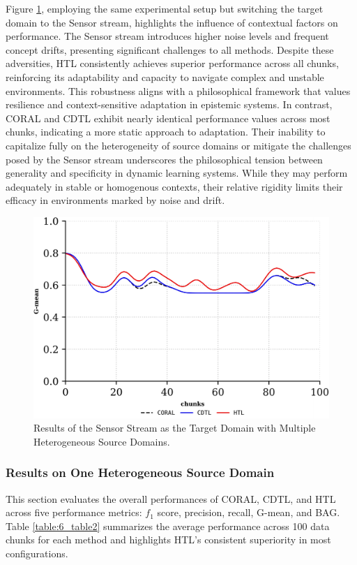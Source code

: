 Figure \ref{fig:6_exp5}, employing the same experimental setup but switching the target domain to the Sensor stream, highlights the influence of contextual factors on performance. The Sensor stream introduces higher noise levels and frequent concept drifts, presenting significant challenges to all methods. Despite these adversities, HTL consistently achieves superior performance across all chunks, reinforcing its adaptability and capacity to navigate complex and unstable environments. This robustness aligns with a philosophical framework that values resilience and context-sensitive adaptation in epistemic systems. In contrast, CORAL and CDTL exhibit nearly identical performance values across most chunks, indicating a more static approach to adaptation. Their inability to capitalize fully on the heterogeneity of source domains or mitigate the challenges posed by the Sensor stream underscores the philosophical tension between generality and specificity in dynamic learning systems. While they may perform adequately in stable or homogenous contexts, their relative rigidity limits their efficacy in environments marked by noise and drift.
\begin{figure}[H]
	\centering
	\includegraphics[width=0.6\linewidth]{6_transfer_learning/figures/exp3.png}
  \caption{Results of the Sensor Stream as the Target Domain with Multiple Heterogeneous Source Domains.}

	\label{fig:6_exp5}
\end{figure}

\subsubsection{Results on One Heterogeneous Source Domain}
This section evaluates the overall performances of CORAL, CDTL, and HTL across five performance metrics: $f_1$ score, precision, recall, G-mean, and BAG. Table \ref{table:6_table2} summarizes the average performance across 100 data chunks for each method and highlights HTL's consistent superiority in most configurations.


